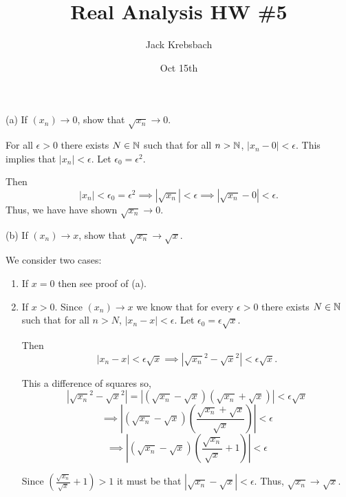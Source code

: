 \documentclass{report}
\title{Real Analysis HW \#5}
\author{Jack Krebsbach }
\date{Oct 15th}
\begin{document}
\maketitle
{}

\bigskip
(a) If $\left(x_n\right) \rightarrow 0$, show that $\sqrt{x_n} \rightarrow 0$.

\begin{myproof}
\bigskip
For all $\epsilon >0$ there exists $N \in \NN$ such that for all $n> \NN$, $|x_n - 0| < \epsilon.$
This implies that $|x_n| < \epsilon.$ Let $\epsilon_0 = \epsilon^2.$

Then $$|x_n| < \epsilon_0 = \epsilon^2 \implies |\sqrt{x_n}| < \epsilon  \implies  |\sqrt{x_n} - 0| < \epsilon.$$ Thus, we have have shown $\sqrt{x_n} \rightarrow 0.$
\end{myproof}

\bigskip
(b) If $\left(x_n\right) \rightarrow x$, show that $\sqrt{x_n} \rightarrow \sqrt{x}$.


\bigskip
\begin{myproof}
We consider two cases: 
\begin{enumerate}
  \item If $x = 0$ then see proof of (a).
  \item If $x > 0.$  Since $(x_n) \rightarrow x$ we know that for every $\epsilon >0 $ there exists $N \in \NN$ such that for all $n > N$, $|x_n -x | < \epsilon.$ Let $\epsilon_0 = \epsilon \sqrt{x}.$

    Then $$\left|x_n -x  \right| < \epsilon \sqrt{x} \implies \left| \sqrt{x_n}^2 - \sqrt{x}^2  \right| < \epsilon \sqrt{x}.$$

This a difference of squares so, $$\left| \sqrt{x_n}^2 - \sqrt{x}^2  \right| = \left| (\sqrt{x_n} - \sqrt{x})(\sqrt{x_n} + \sqrt{x})  \right| < \epsilon \sqrt{x}$$
$$ \implies\left| (\sqrt{x_n} - \sqrt{x}) \left(\frac{\sqrt{x_n} + \sqrt{x}}{\sqrt{x}}\right)\right| < \epsilon$$
$$ \implies\left| (\sqrt{x_n} - \sqrt{x}) \left(\frac{\sqrt{x_n}}{\sqrt{x}} + 1 \right)\right| < \epsilon$$

Since $\left(\frac{\sqrt{x_n}}{\sqrt{x}} + 1\right) > 1$ it must be that  $\left|\sqrt{x_n} - \sqrt{x}\right| < \epsilon.$ Thus, $\sqrt{x_n} \rightarrow \sqrt{x}.$
\end{enumerate}
\end{myproof}
\end{document}
